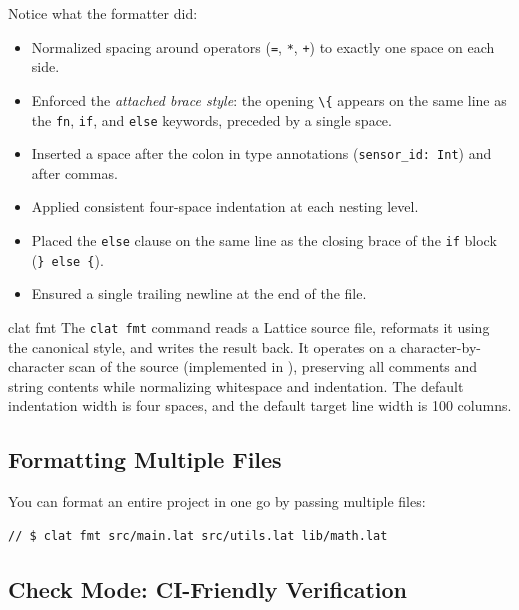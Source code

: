 Notice what the formatter did:

\begin{itemize}
  \item Normalized spacing around operators (\lstinline|=|, \lstinline|*|, \lstinline|+|) to exactly one space on each side.
  \item Enforced the \emph{attached brace style}: the opening \lstinline|\{| appears on the same line as the \lstinline|fn|, \lstinline|if|, and \lstinline|else| keywords, preceded by a single space.
  \item Inserted a space after the colon in type annotations (\lstinline|sensor_id: Int|) and after commas.
  \item Applied consistent four-space indentation at each nesting level.
  \item Placed the \lstinline|else| clause on the same line as the closing brace of the \lstinline|if| block (\lstinline|} else {|).
  \item Ensured a single trailing newline at the end of the file.
\end{itemize}

\begin{defnbox}{clat fmt}
The \lstinline|clat fmt| command reads a Lattice source file, reformats it using the canonical style, and writes the result back. It operates on a character-by-character scan of the source (implemented in ), preserving all comments and string contents while normalizing whitespace and indentation. The default indentation width is four spaces, and the default target line width is 100 columns.
\end{defnbox}

\subsection{Formatting Multiple Files}\label{sec:fmt-multiple-files}

You can format an entire project in one go by passing multiple files:

\begin{lstlisting}[language=Lattice, caption={Formatting several files at once}]
// $ clat fmt src/main.lat src/utils.lat lib/math.lat
\end{lstlisting}

\subsection{Check Mode: CI-Friendly Verification}\label{sec:fmt-check}

